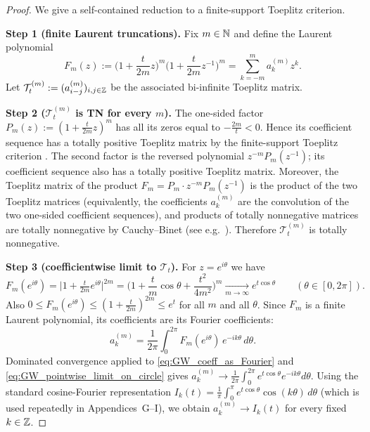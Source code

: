 \begin{proof}
We give a self-contained reduction to a finite-support Toeplitz criterion.

\medskip
\textbf{Step 1 (finite Laurent truncations).}
Fix $m\in\mathbb N$ and define the Laurent polynomial
\begin{equation}
\label{eq:GW_laurent_truncation_Fm}
F_m(z):=\Big(1+\frac{t}{2m}z\Big)^m\Big(1+\frac{t}{2m}z^{-1}\Big)^m
=\sum_{k=-m}^{m} a_k^{(m)} z^k.
\end{equation}
Let $\mathcal T_t^{(m)}:=(a_{i-j}^{(m)})_{i,j\in\mathbb Z}$ be the associated bi-infinite Toeplitz matrix.

\medskip
\textbf{Step 2 ($\mathcal T_t^{(m)}$ is TN for every $m$).}
The one-sided factor $P_m(z):=(1+\frac{t}{2m}z)^m$ has all its zeros equal to $-\frac{2m}{t}<0$.
Hence its coefficient sequence has a totally positive Toeplitz matrix by the finite-support Toeplitz criterion
\cite[Thm.~4.5]{Pinkus1996}.
The second factor is the reversed polynomial $z^{-m}P_m(z^{-1})$; its coefficient sequence also has a totally positive Toeplitz matrix.
Moreover, the Toeplitz matrix of the product $F_m=P_m\cdot z^{-m}P_m(z^{-1})$ is the product of the two Toeplitz matrices
(equivalently, the coefficients $a_k^{(m)}$ are the convolution of the two one-sided coefficient sequences),
and products of totally nonnegative matrices are totally nonnegative by Cauchy--Binet
(see e.g.\ \cite[Prop.~1.4]{Pinkus1996}).
Therefore $\mathcal T_t^{(m)}$ is totally nonnegative.

\medskip
\textbf{Step 3 (coefficientwise limit to $\mathcal T_t$).}
For $z=e^{i\theta}$ we have
\begin{equation}
\label{eq:GW_pointwise_limit_on_circle}
F_m(e^{i\theta})=\big|1+\tfrac{t}{2m}e^{i\theta}\big|^{2m}
=\Big(1+\frac{t}{m}\cos\theta+\frac{t^2}{4m^2}\Big)^m\xrightarrow[m\to\infty]{}e^{t\cos\theta}
\qquad(\theta\in[0,2\pi]).
\end{equation}
Also $0\le F_m(e^{i\theta})\le (1+\tfrac{t}{2m})^{2m}\le e^{t}$ for all $m$ and all $\theta$.
Since $F_m$ is a finite Laurent polynomial, its coefficients are its Fourier coefficients:
\begin{equation}
\label{eq:GW_coeff_as_Fourier}
a_k^{(m)}=\frac{1}{2\pi}\int_0^{2\pi} F_m(e^{i\theta})\,e^{-ik\theta}\,d\theta.
\end{equation}
Dominated convergence applied to \eqref{eq:GW_coeff_as_Fourier} and \eqref{eq:GW_pointwise_limit_on_circle} gives
$a_k^{(m)}\to \frac{1}{2\pi}\int_0^{2\pi} e^{t\cos\theta}e^{-ik\theta}d\theta$.
Using the standard cosine-Fourier representation
\(
I_k(t)=\frac{1}{\pi}\int_0^{\pi} e^{t\cos\theta}\cos(k\theta)\,d\theta
\) (which is used repeatedly in Appendices~G--I),
we obtain $a_k^{(m)}\to I_k(t)$ for every fixed $k\in\mathbb Z$.


\end{proof}
